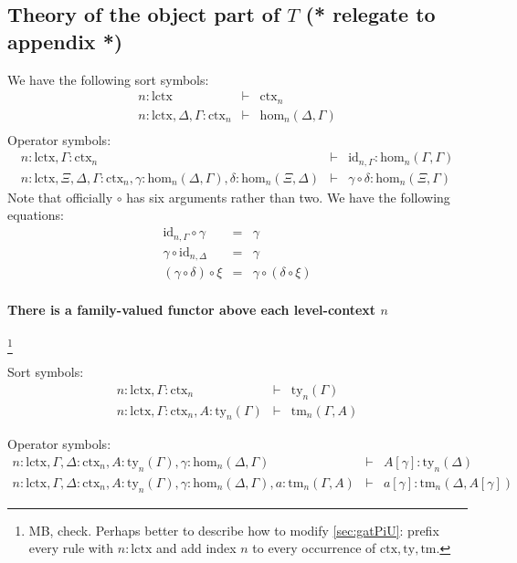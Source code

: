 \documentclass[11pt,a4paper]{article}
\theoremstyle{definition}
\newcommand{\id}{\mathsf{id}}
\def\Hom{\mathrm{hom}}
\def\id{\mathrm{id}}
\def\lctx{\mathrm{lctx}}
\newcommand{\ctx}{\mathrm{ctx}}
\newcommand{\ty}{\mathrm{ty}}
\newcommand{\tm}{\mathrm{tm}}
\begin{document}
\subsection{Theory of the object part of $T$ (* relegate to appendix *) }
We have the following sort symbols:
\begin{eqnarray*}
n : \lctx &\vdash& \ctx_n\\
n : \lctx, \Delta, \Gamma : \ctx_n &\vdash& \Hom_n(\Delta,\Gamma)\\
\end{eqnarray*}
Operator symbols:
\begin{eqnarray*}
n : \lctx, \Gamma : \ctx_n &\vdash& \id_{n,\Gamma} : \Hom_n(\Gamma,\Gamma)\\
n : \lctx, \Xi,\Delta,\Gamma : \ctx_n, \gamma : \Hom_n(\Delta,\Gamma), \delta : \Hom_n(\Xi,\Delta) &\vdash&
\gamma \circ \delta : \Hom_n(\Xi,\Gamma)
\end{eqnarray*}
Note that officially $\circ$ has six arguments rather than two.
We have the following equations:
\begin{eqnarray*}
\id_{n,\Gamma} \circ \gamma &=& \gamma \\
 \gamma \circ \id_{n,\Delta} &=& \gamma \\
(\gamma \circ \delta) \circ \xi &=& \gamma \circ (\delta \circ \xi)
\end{eqnarray*}


\paragraph{There is a family-valued functor above each level-context $n$}

\footnote{MB, check. Perhaps better to describe how to modify \ref{sec:gatPiU}:
prefix every rule with $n:\lctx$ and add index $n$ to every occurrence
of $\ctx,\ty,\tm$.}

Sort symbols:
\begin{eqnarray*}
n : \lctx, \Gamma : \ctx_n &\vdash& \ty_n(\Gamma)\\
n : \lctx, \Gamma : \ctx_n, A:\ty_n(\Gamma) &\vdash& \tm_n(\Gamma,A)
\end{eqnarray*}

Operator symbols:
\begin{eqnarray*}
n : \lctx, \Gamma,\Delta : \ctx_n, A:\ty_n(\Gamma), \gamma : \Hom_n(\Delta,\Gamma) &\vdash&
A[\gamma] : \ty_n(\Delta)\\
n : \lctx, \Gamma,\Delta : \ctx_n, A:\ty_n(\Gamma), \gamma : \Hom_n(\Delta,\Gamma), a:\tm_n(\Gamma,A) &\vdash&  a[\gamma] : \tm_n(\Delta,A[\gamma])
\end{eqnarray*}
\end{document}
